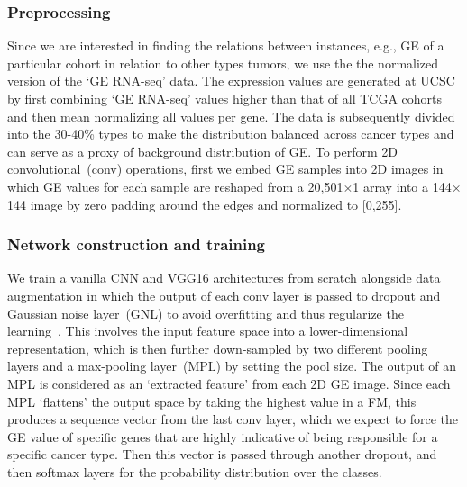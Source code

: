 \subsubsection{Preprocessing}
Since we are interested in finding the relations between instances, e.g., GE of a particular cohort in relation to other types tumors, we use the the normalized version of the `GE RNA-seq' data. The expression values are generated at UCSC by first combining `GE RNA-seq' values higher than that of all TCGA cohorts and then mean normalizing all values per gene. The data is subsequently divided into the 30-40\% types to make the distribution balanced across cancer types and can serve as a proxy of background distribution of GE. To perform 2D  convolutional~(conv) operations, first we embed GE samples into 2D images in which GE values for each sample are reshaped from a 20,501$\times$1 array into a 144$\times$144 image by zero padding around the edges and normalized to [0,255].%

\subsubsection{Network construction and training}
We train a vanilla CNN and VGG16 architectures from scratch alongside data augmentation in which the output of each conv layer is passed to dropout and Gaussian noise layer~(GNL) to avoid overfitting and thus regularize the learning~\cite{vardropout}. This involves the input feature space into a lower-dimensional representation, which is then further down-sampled by two different pooling layers and a max-pooling layer~(MPL) by setting the pool size. The output of an MPL is considered as an `extracted feature' from each 2D GE image. Since each MPL `flattens' the output space by taking the highest value in a FM, this produces a sequence vector from the last conv layer, which we expect to force the GE value of specific genes that are highly indicative of being responsible for a specific cancer type. Then this vector is passed through another dropout, and then softmax layers for the probability distribution over the classes.

